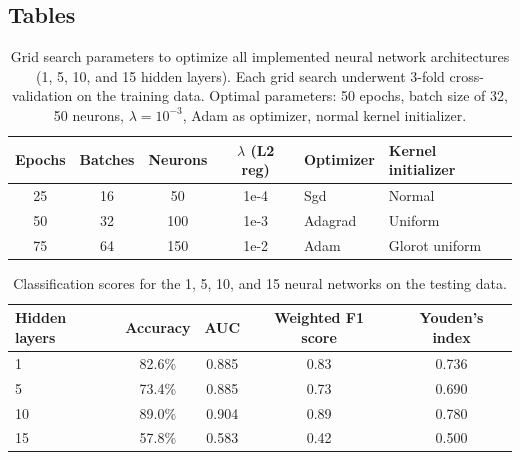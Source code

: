 \documentclass[10pt, letterpaper, twocolumn]{article}
\begin{document}
\clearpage

\subsection{Tables}
\begin{table}[h]
    \caption{Grid search parameters to optimize all implemented neural network architectures (1, 5, 10, and 15 hidden layers). Each grid search underwent 3-fold cross-validation on the training data. Optimal parameters: 50 epochs, batch size of 32, 50 neurons, $\lambda=10^{-3}$, Adam as optimizer, normal kernel initializer.}
    \centering
    \label{tab:params}
    \begin{tabular}{c c c c l l}
        \toprule
        Epochs & Batches & Neurons & $\lambda$ (L2 reg) & Optimizer & Kernel initializer \\
        \midrule
        25 & 16 & 50 & 1e-4 & Sgd & Normal \\
        50 & 32 & 100 & 1e-3 & Adagrad & Uniform \\
        75 & 64 & 150 & 1e-2 & Adam & Glorot uniform \\
        \bottomrule
    \end{tabular}
\end{table}


\begin{table}[h]
	\caption{Classification scores for the 1, 5, 10, and 15 neural networks on the testing data.}
	\centering
	\label{tab:class_scores}
	\begin{tabular}{l c c c c}
		\toprule
		Hidden layers & Accuracy & AUC & Weighted F1 score & Youden's index\\
		\midrule
		1 & 82.6\% & 0.885 & 0.83 & 0.736 \\
		5 & 73.4\% & 0.885 & 0.73 & 0.690 \\
		10 & 89.0\% & 0.904 & 0.89 & 0.780 \\
		15 & 57.8\% & 0.583 & 0.42 & 0.500 \\
		\bottomrule
	\end{tabular}
\end{table}
\end{document}

